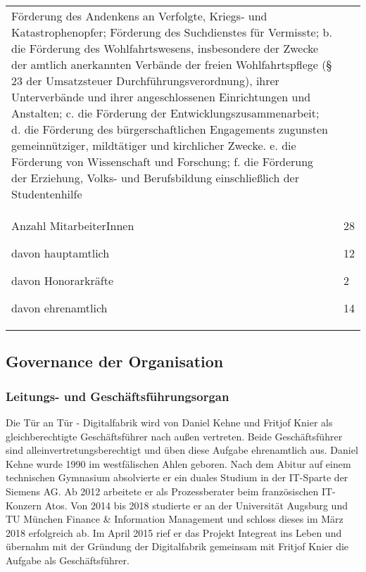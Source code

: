 \documentclass[12pt, a4paper]{article} %
\begin{document}
\begin{longtable}[]{@{}ll@{}}
\begin{minipage}[t]{0.47\columnwidth}
Förderung des Andenkens an Verfolgte, Kriegs- und Katastrophenopfer;
Förderung des Suchdienstes für Vermisste; b. die Förderung des
Wohlfahrtswesens, insbesondere der Zwecke der amtlich anerkannten
Verbände der freien Wohlfahrtspflege (§ 23 der Umsatzsteuer
Durchführungsverordnung), ihrer Unterverbände und ihrer angeschlossenen
Einrichtungen und Anstalten; c. die Förderung der
Entwicklungszusammenarbeit; d. die Förderung des bürgerschaftlichen
Engagements zugunsten gemeinnütziger, mildtätiger und kirchlicher
Zwecke. e. die Förderung von Wissenschaft und Forschung; f. die
Förderung der Erziehung, Volks- und Berufsbildung einschließlich der
Studentenhilfe\strut
\end{minipage}\tabularnewline
\begin{minipage}[t]{0.47\columnwidth}\raggedright
Anzahl MitarbeiterInnen

davon hauptamtlich

davon Honorarkräfte

davon ehrenamtlich\strut
\end{minipage} & \begin{minipage}[t]{0.47\columnwidth}\raggedright
28

12

2

14\strut
\end{minipage}\tabularnewline
\bottomrule
\end{longtable}

\hypertarget{governance-der-organisation}{%
\subsection{Governance der
Organisation}\label{governance-der-organisation}}

\hypertarget{leitungs--und-geschuxe4ftsfuxfchrungsorgan}{%
\subsubsection{Leitungs- und
Geschäftsführungsorgan}\label{leitungs--und-geschuxe4ftsfuxfchrungsorgan}}

Die Tür an Tür - Digitalfabrik wird von Daniel Kehne und Fritjof Knier
als gleichberechtigte Geschäftsführer nach außen vertreten. Beide
Geschäftsführer sind alleinvertretungsberechtigt und üben diese Aufgabe
ehrenamtlich aus. Daniel Kehne wurde 1990 im westfälischen Ahlen
geboren. Nach dem Abitur auf einem technischen Gymnasium absolvierte er
ein duales Studium in der IT-Sparte der Siemens AG. Ab 2012 arbeitete er
als Prozessberater beim französischen IT-Konzern Atos. Von 2014 bis 2018
studierte er an der Universität Augsburg und TU München Finance \&
Information Management und schloss dieses im März 2018 erfolgreich ab.
Im April 2015 rief er das Projekt Integreat ins Leben und übernahm mit
der Gründung der Digitalfabrik gemeinsam mit Fritjof Knier die Aufgabe
als Geschäftsführer.
\end{document}
